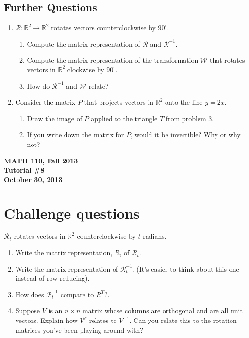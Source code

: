 \documentclass[11pt]{exam}
\newcommand{\R}{\mathbb{R}}
\newcommand{\mthCourse}{MATH 110}
\newcommand{\mthTerm}{Fall 2013}
\newcommand{\mthTutorialNumber}{8}
\newcommand{\mthDate}{October 30, 2013}
\begin{document}
\subsection*{Further Questions}
\begin{enumerate}[resume]
	\item $\mathcal R:\R^2\to\R^2$ rotates vectors counterclockwise
		by $90^{\circ}$.
		\begin{enumerate}
			\item Compute the matrix representation of $\mathcal R$
				and $\mathcal R^{-1}$.
			\item Compute the matrix representation of the transformation $\mathcal W$
				that rotates vectors in $\R^2$ clockwise by $90^\circ$.
			\item How do $\mathcal R^{-1}$ and $\mathcal W$ relate?
		\end{enumerate}
	\item Consider the matrix $P$ that projects vectors in $\R^2$ onto
		the line $y=2x$.
		\begin{enumerate}
			\item Draw the image of $P$ applied to the triangle $T$ from
				problem 3.
			\item If you write down the matrix for $P$, would it be invertible?
				Why or why not?
		\end{enumerate}
\end{enumerate}




\newpage
{
	\begin{center}
		{\bf \mthCourse, \mthTerm}\\ 
		{\bf Tutorial \#\mthTutorialNumber}\\
		{\bf \mthDate}
	\end{center}
}

\section*{Challenge questions}

	$\mathcal R_t$ rotates vectors in $\R^2$ counterclockwise
		by $t$ radians.
\begin{enumerate}[resume]
	\item   Write the matrix representation, $R$, of $\mathcal R_t$.
	\item Write the matrix representation of $\mathcal R_t^{-1}$. (It's
		easier to think about this one instead of row reducing).
	\item How does $\mathcal R_t^{-1}$ compare to $R^T$?.
	\item Suppose $V$ is an $n\times n$ matrix whose columns are orthogonal
		and are all unit vectors.  Explain how $V^T$ relates to $V^{-1}$.
		Can you relate this to the rotation matrices you've been playing
		around with?

\end{enumerate}
\end{document}
